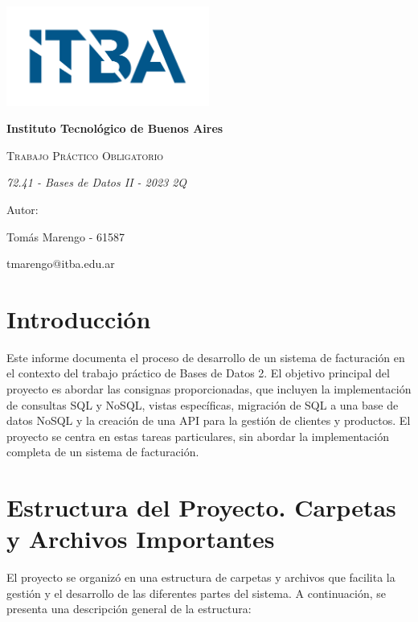 \documentclass[a4paper,12pt]{article}
\begin{document}
	\begin{titlepage}
		\centering
		{\includegraphics[width=0.50\textwidth]{LogoITBA}\par}
		\vspace{1cm}
		{\bfseries\LARGE Instituto Tecnol\'ogico de Buenos Aires \par}
		\vspace{2cm}
		{\scshape\Huge Trabajo Práctico Obligatorio \par}
		\vspace{2cm}
		{\itshape\Large 72.41 - Bases de Datos II - 2023 2Q \par}
		\vfill
		{\Large Autor: \par}
		{\Large Tom\'as Marengo - 61587 \par}
		{\Large tmarengo@itba.edu.ar \par}	
		\vfill
	\end{titlepage}

	\newpage
	\tableofcontents
	\newpage
	
	\section{Introducción}
	Este informe documenta el proceso de desarrollo de un sistema de facturación en el contexto del trabajo práctico de Bases de Datos 2. El objetivo principal del proyecto es abordar las consignas proporcionadas, que incluyen la implementación de consultas SQL y NoSQL, vistas específicas, migración de SQL a una base de datos NoSQL y la creación de una API para la gestión de clientes y productos. El proyecto se centra en estas tareas particulares, sin abordar la implementación completa de un sistema de facturación.

	\newpage
	
	\section{Estructura del Proyecto. Carpetas y Archivos Importantes}
	
	El proyecto se organizó en una estructura de carpetas y archivos que facilita la gestión y el desarrollo de las diferentes partes del sistema. A continuación, se presenta una descripción general de la estructura:
	
\end{document}
